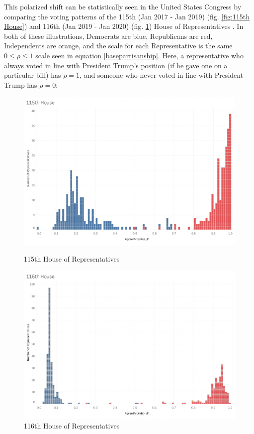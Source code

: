 \documentclass[preprint,review,12pt]{elsarticle}
\begin{document}
This polarized shift can be statistically seen in the United States Congress by comparing the voting patterns of the 115th (Jan 2017 - Jan 2019) (fig. \ref{fig:115th House}) and 116th (Jan 2019 - Jan 2020) (fig. \ref{fig:116th House}) House of Representatives \cite{fivethirtyeight2018tracking}. In both of these illustrations, Democrats are blue, Republicans are red, Independents are orange, and the scale for each Representative is the same $0\leq \rho \leq 1$ scale seen in equation \ref{basepartisanship}. Here, a representative who always voted in line with President Trump's position (if he gave one on a particular bill) has $\rho = 1$, and someone who never voted in line with President Trump has $\rho = 0$:

 \begin{figure}[h]
  \includegraphics[width=\linewidth]{115th House.png}
  \caption{115th House of Representatives}\label{fig:115th House}
\endminipage\hfill
{}
  \includegraphics[width=\linewidth]{116th House.png}
  \caption{116th House of Representatives}\label{fig:116th House}
\endminipage\hfill
\end{figure}
 
\end{document}

